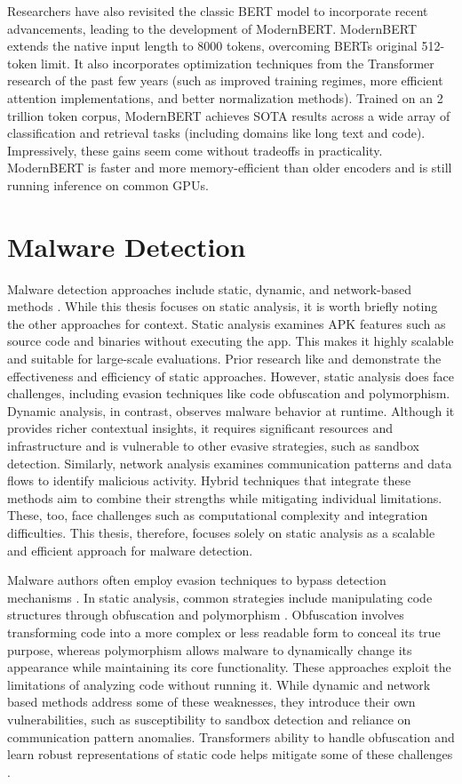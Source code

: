 Researchers have also revisited the classic BERT model to incorporate recent advancements, 
leading to the development of ModernBERT.
ModernBERT extends the native input length to 8000 tokens, overcoming BERTs original 512-token limit. 
It also incorporates optimization techniques from the Transformer research of the past few years 
(such as improved training regimes, more efficient attention implementations, 
and better normalization methods). 
Trained on an 2 trillion token corpus, ModernBERT achieves SOTA results across a wide array of 
classification and retrieval tasks (including domains like long text and code). 
Impressively, these gains seem come without tradeoffs in practicality.
ModernBERT is faster and more memory-efficient than older encoders and is still 
running inference on common GPUs.

\section{Malware Detection}

Malware detection approaches include static, dynamic, and network-based methods \cite{vorlesung}.
While this thesis focuses on static analysis, it is worth briefly noting the other approaches for context.
Static analysis examines APK features such as source code and binaries without executing the app.
This makes it highly scalable and suitable for large-scale evaluations.
Prior research like \cite{drebin} and \cite{detectbert} demonstrate the effectiveness and efficiency of static approaches.
However, static analysis does face challenges, including evasion techniques like code obfuscation and polymorphism.
Dynamic analysis, in contrast, observes malware behavior at runtime.
Although it provides richer contextual insights, it requires significant resources and infrastructure and is vulnerable to other evasive strategies, such as sandbox detection.
Similarly, network analysis examines communication patterns and data flows to identify malicious activity.
Hybrid techniques that integrate these methods aim to combine their strengths while mitigating individual limitations.
These, too, face challenges such as computational complexity and integration difficulties.
This thesis, therefore, focuses solely on static analysis as a scalable and efficient approach for malware detection.

Malware authors often employ evasion techniques to bypass detection mechanisms \cite{vorlesung}.
In static analysis, common strategies include manipulating code structures through obfuscation \cite{obfuscation} and polymorphism \cite{polymorhism}.
Obfuscation involves transforming code into a more complex or less readable form to conceal its true purpose, whereas polymorphism allows malware to dynamically change its appearance while maintaining its core functionality.
These approaches exploit the limitations of analyzing code without running it.
While dynamic and network based methods address some of these weaknesses, they introduce their own vulnerabilities, such as susceptibility to sandbox detection and reliance on communication pattern anomalies.
Transformers ability to handle obfuscation and learn robust representations of static code helps mitigate some of these challenges \cite{deobfuscation}.

